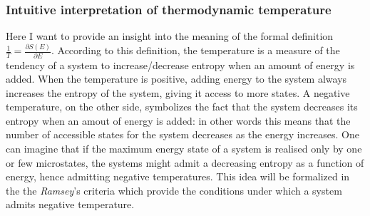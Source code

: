 \subsubsection*{Intuitive interpretation of thermodynamic temperature}
Here I want to provide an insight into the meaning of the formal definition $\frac{1}{T} = \frac{\partial S(E)}{\partial E}$. According to this definition, the temperature is 
a measure of the tendency of a system to increase/decrease entropy when an amount of energy is added. When the temperature is positive, adding energy to the system always 
increases the entropy of the system, giving it access to more states. A negative temperature, on the other side, symbolizes the fact that the system decreases its entropy when an amout of energy is added: in other 
words this means that the number of accessible states for the system decreases as the energy increases. One can imagine that if the maximum energy state of a system is realised only by one or few microstates, the systems might admit a decreasing 
entropy as a function of energy, hence admitting negative temperatures. This idea will be formalized in the the \emph{Ramsey}'s criteria which provide the conditions under which a system admits negative temperature.